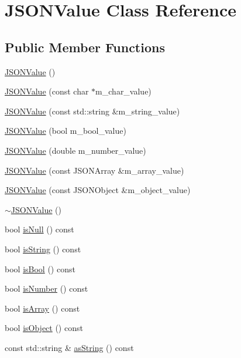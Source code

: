 \hypertarget{classJSONValue}{
\section{JSONValue Class Reference}
\label{classJSONValue}
}
\subsection*{Public Member Functions}
\begin{DoxyCompactItemize}
\item 
\hyperlink{classJSONValue_a53cb9b84540e492d5c8efb8d84906bd0}{JSONValue} ()
\item 
\hyperlink{classJSONValue_acf94f34e1fc0f01064951c17461d63c9}{JSONValue} (const char $\ast$m\_\-char\_\-value)
\item 
\hyperlink{classJSONValue_a501f04137258c93343a0c6815c3ca96b}{JSONValue} (const std::string \&m\_\-string\_\-value)
\item 
\hyperlink{classJSONValue_aafcc30e3701ee1d34d54793810929518}{JSONValue} (bool m\_\-bool\_\-value)
\item 
\hyperlink{classJSONValue_a07cea2c451d953c4e7767edc845cf6b1}{JSONValue} (double m\_\-number\_\-value)
\item 
\hyperlink{classJSONValue_a65bd13526af5f626d0c498109dcc52aa}{JSONValue} (const JSONArray \&m\_\-array\_\-value)
\item 
\hyperlink{classJSONValue_a2f1580969809665bd204dca3774226f5}{JSONValue} (const JSONObject \&m\_\-object\_\-value)
\item 
\hyperlink{classJSONValue_ae71766eb548ae78c060f0c308ceceb4b}{$\sim$JSONValue} ()
\item 
bool \hyperlink{classJSONValue_a0aee5e9041833102ace9c295c5ba04a1}{isNull} () const 
\item 
bool \hyperlink{classJSONValue_a7d55132933149e63e76a49c468142461}{isString} () const 
\item 
bool \hyperlink{classJSONValue_aead35875f85ebe8218ae008bc94287d5}{isBool} () const 
\item 
bool \hyperlink{classJSONValue_ae18150f35323645dc3b1e6d1bc217196}{isNumber} () const 
\item 
bool \hyperlink{classJSONValue_ae42e5a0a9a847948d88d21d904fa6ae2}{isArray} () const 
\item 
bool \hyperlink{classJSONValue_a4f55c32b852110bb4fbf6ae1bceb572d}{isObject} () const 
\item 
const std::string \& \hyperlink{classJSONValue_a027350e28f091ad41fc537d965ed6b42}{asString} () const 

\end{DoxyCompactItemize}
